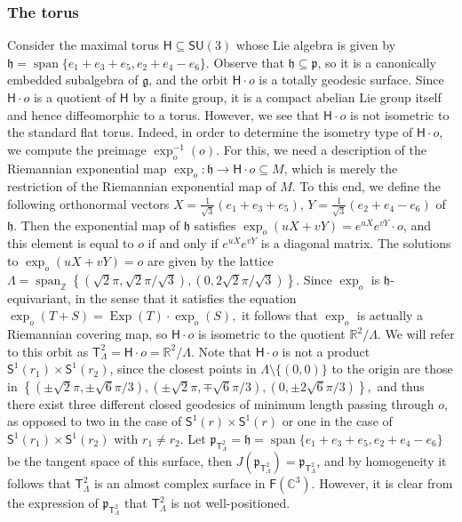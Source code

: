 \documentclass[11pt,a4paper,final]{amsart}
\newcommand{\s}{\mathsf}
\newcommand{\g}{\mathfrak}
\newcommand{\R}{\mathbb{R}}
\newcommand{\C}{\mathbb{C}}
\newcommand{\vecspan}{\operatorname{span}}
\newcommand{\Exp}{\operatorname{Exp}}
\theoremstyle{definition}
\begin{document}
\subsubsection{The torus \cite[Example~3.3]{CwiklinskiVrancken}}
Consider the maximal torus $\mathsf{H}\subseteq\mathsf{SU}(3)$ whose Lie algebra is given by $\g{h}=\vecspan\{e_{1}+e_{3}+e_{5},e_{2}+e_{4}-e_{6}\}$.
Observe that $\g{h}\subseteq \g{p}$, so it is a canonically embedded subalgebra of $\g{g}$, and the orbit $\mathsf{H}\cdot o$ is a totally geodesic surface.
Since $\mathsf{H}\cdot o$ is a quotient of $\mathsf{H}$ by a finite group, it is a compact abelian Lie group itself and hence diffeomorphic to a torus.
However, we see that $\mathsf{H}\cdot o$ is not isometric to the standard flat torus.
Indeed, in order to determine the isometry type of $\mathsf{H}\cdot o$, we compute the preimage $\exp_{o}^{-1}(o)$.
For this, we need a description of the Riemannian exponential map $\exp_{o}\colon \g{h}\to \mathsf{H}\cdot o\subseteq M$, which is merely the restriction of the Riemannian exponential map of $M$.
To this end, we define the following orthonormal vectors $X=\frac{1}{\sqrt{3}}(e_{1}+e_{3}+e_{5})$, $Y=\frac{1}{\sqrt{3}}(e_{2}+e_{4}-e_{6})$ of $\g{h}$.
Then the exponential map of $\g{h}$ satisfies $\exp_{o}(u X + v Y)=e^{u X}e^{v Y} \cdot o$, and this element is equal to $o$ if and only if $e^{uX}e^{vY}$ is a diagonal matrix.
The solutions to $\exp_{o}(u X + v Y)=o$ are given by the lattice $\Lambda=\vecspan_{\mathbb{Z}}\left\{ \left( \sqrt{2}\pi ,\sqrt{2}\pi/\sqrt{3} \right),\left( 0,2\sqrt{2}\pi/\sqrt{3} \right) \right\}$.
Since $\exp_{o}$ is $\g{h}$-equivariant, in the sense that it satisfies the equation
$
\exp_{o}(T+S)=\Exp(T)\cdot \exp_{o}(S),
$
it follows that $\exp_{o}$ is actually a Riemannian covering map, so $\mathsf{H}\cdot o$ is isometric to the quotient $\R^{2}/\Lambda$.
We will refer to this orbit as $\mathsf{T}^2_{\Lambda}=\mathsf{H}\cdot o=\R^{2}/\Lambda$.
Note that $\mathsf{H}\cdot o$ is not a product $\mathsf{S}^{1}(r_{1})\times \mathsf{S}^{1}(r_{2})$, since the closest points in $\Lambda\setminus\{(0,0)\}$ to the origin are those in
$
\left\{
	\left( \pm\sqrt{2}\pi ,\pm\sqrt{6}\pi/3 \right),
	\left( \pm\sqrt{2}\pi ,\mp\sqrt{6}\pi/3 \right),
	\left( 0,\pm2\sqrt{6}\pi/3 \right)
\right\},
$
and thus there exist three different closed geodesics of minimum length passing through $o$, as opposed to two in the case of $\mathsf{S}^{1}(r)\times\mathsf{S}^{1}(r)$ or one in the case of $\mathsf{S}^{1}(r_{1})\times\mathsf{S}^{1}(r_{2})$ with $r_{1}\neq r_{2}$.
Let $\g{p}_{\mathsf{T}^2_{\Lambda}}=\g{h}=\vecspan\{e_{1}+e_{3}+e_{5},e_{2}+e_{4}-e_{6}\}$
be the tangent space of this surface, then $J(\g{p}_{\mathsf{T}^2_{\Lambda}})=\g{p}_{\mathsf{T}^2_{\Lambda}}$, and by homogeneity it follows that $\mathsf{T}^2_{\Lambda}$ is an almost complex surface in $\mathsf{F}(\C^{3})$.
However, it is clear from the expression of $\g{p}_{\s{T}^2_{\Lambda}}$ that $\s{T}^2_{\Lambda}$ is not well-positioned.
	
\end{document}
